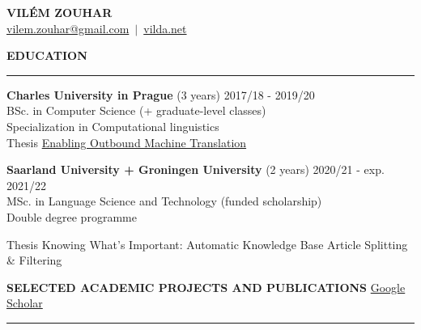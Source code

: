 \documentclass[11pt,a4paper]{article} %
\newcommand{\hSection}[1]{
    \medskip
    \MakeUppercase{\bf #1}
    \medskip
    \hrule
}
\newcommand{\hSectionI}[2]{
    \medskip
    \MakeUppercase{\bf #1}
    \hfill
    #2
    \medskip
    \hrule
}
\begin{document}
\begin{center}
    {\LARGE \bf VILÉM ZOUHAR} \\
    {\large
        \href{mailto:vilem.zouhar@gmail.com}{\color{black} vilem.zouhar@gmail.com}
        \,$|$\,
        \href{https://vilda.net/}{\color{black} vilda.net}
    }
\end{center}

\vspace{\baselineskip}

\begin{minipage}{1\textwidth}
\hSection{Education}\vspace{0.2cm}
{\bf Charles University in Prague} \hfill {(3 years) 2017/18 - 2019/20} \\
BSc. in Computer Science (+ graduate-level classes)\\
Specialization in Computational linguistics \\
Thesis \href{https://dspace.cuni.cz/bitstream/handle/20.500.11956/119400/130284419.pdf?sequence=1&isAllowed=y}{Enabling Outbound Machine Translation}

\vspace{\baselineskip}

{\bf Saarland University\hspace{-0.1cm} +\hspace{-0.1cm} Groningen University} \hfill {(2 years) 2020/21 - exp. 2021/22} \\
MSc. in Language Science and Technology (funded scholarship) \\
Double degree programme \\
\begin{minipage}{1.25\textwidth}
Thesis Knowing What's Important: Automatic Knowledge Base Article Splitting \& Filtering
\end{minipage}
\end{minipage}

\hSectionI{Selected Academic Projects and Publications}{\href{https://scholar.google.com/citations?user=2EUDwtkAAAAJ}{Google Scholar}\hspace{-1.12cm}}
\end{document}
